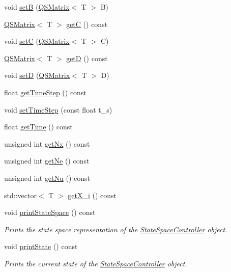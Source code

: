 \begin{DoxyCompactItemize}
\item 
void \hyperlink{classStateSpaceController_ad23bd2d879123819b605bc10f668e95f}{setB} (\hyperlink{classQSMatrix}{Q\+S\+Matrix}$<$ T $>$ B)
\item 
\hyperlink{classQSMatrix}{Q\+S\+Matrix}$<$ T $>$ \hyperlink{classStateSpaceController_a2dd0a3e589883cbefa64117db401eb60}{getC} () const
\item 
void \hyperlink{classStateSpaceController_a753448d4c082e3d794d4186589d4951b}{setC} (\hyperlink{classQSMatrix}{Q\+S\+Matrix}$<$ T $>$ C)
\item 
\hyperlink{classQSMatrix}{Q\+S\+Matrix}$<$ T $>$ \hyperlink{classStateSpaceController_a7f0850ef94f5660a41101cf2fb5221ba}{getD} () const
\item 
void \hyperlink{classStateSpaceController_aafe010871545918c95d15fd9320593aa}{setD} (\hyperlink{classQSMatrix}{Q\+S\+Matrix}$<$ T $>$ D)
\item 
float \hyperlink{classStateSpaceController_acc70705c898b1338346b63e83ea4fe2a}{get\+Time\+Step} () const
\item 
void \hyperlink{classStateSpaceController_a2e3ce5df26ef4e0d89c7ff8668a6d5c5}{set\+Time\+Step} (const float t\+\_\+s)
\item 
float \hyperlink{classStateSpaceController_a6bb6da64c47f0c54dd1de17030f694a4}{get\+Time} () const
\item 
unsigned int \hyperlink{classStateSpaceController_ae60e8d45a68c0510a3b9b1f9fef144bb}{get\+Nx} () const
\item 
unsigned int \hyperlink{classStateSpaceController_a0fac286142187799c135d236f389090d}{get\+Ne} () const
\item 
unsigned int \hyperlink{classStateSpaceController_a05e9deaeb91afc5e2a2009768e72850e}{get\+Nu} () const
\item 
std\+::vector$<$ T $>$ \hyperlink{classStateSpaceController_a0d7bd27e0139221d7b2de5e7e8830d98}{get\+X\+\_\+i} () const
\item 
void \hyperlink{classStateSpaceController_a3a32ed909b03a681e9c9a04bff3ae45d}{print\+State\+Space} () const
\begin{DoxyCompactList}\small\item\em Prints the state space representation of the \hyperlink{classStateSpaceController}{State\+Space\+Controller} object. \end{DoxyCompactList}\item 
void \hyperlink{classStateSpaceController_aeded9d7ac25593444de4448a4369064d}{print\+State} () const
\begin{DoxyCompactList}\small\item\em Prints the current state of the \hyperlink{classStateSpaceController}{State\+Space\+Controller} object. \end{DoxyCompactList}\item 

\end{DoxyCompactItemize}
